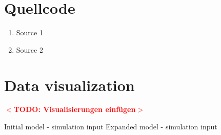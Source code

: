 \documentclass[12pt,a4paper]{book}
\newcommand{\TODO}[1]{\textbf{\textcolor{red}{$<$TODO: #1$>$}}}
\begin{document}
\chapter{Quellcode}
\begin{enumerate}
      \item Source 1
      \item Source 2
\end{enumerate}



\chapter{Data visualization}

%
\TODO{Visualisierungen einfügen}
\begin{center}
	Initial model - simulation input
	\label{fig:initmodel_siminput}
	Expanded model - simulation input
	\label{fig:expandedmodel_siminput}
\end{center}
\end{document}
